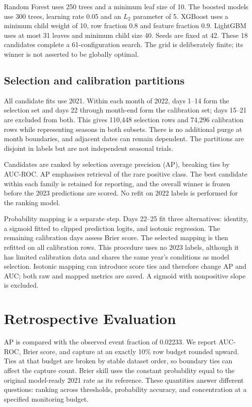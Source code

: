 \documentclass[conference]{IEEEtran}
\begin{document}
Random Forest uses 250 trees and a minimum leaf size of 10. The boosted models use 300 trees, learning rate 0.05 and an $L_2$ parameter of 5. XGBoost uses a minimum child weight of 10, row fraction 0.8 and feature fraction 0.9. LightGBM uses at most 31 leaves and minimum child size 40. Seeds are fixed at 42. These 18 candidates complete a 61-configuration search. The grid is deliberately finite; its winner is not asserted to be globally optimal.

\subsection{Selection and calibration partitions}
All candidate fits use 2021. Within each month of 2022, days 1--14 form the selection set and days 22 through month-end form the calibration set; days 15--21 are excluded from both. This gives 110,448 selection rows and 74,296 calibration rows while representing seasons in both subsets. There is no additional purge at month boundaries, and adjacent dates can remain dependent. The partitions are disjoint in labels but are not independent seasonal trials.

Candidates are ranked by selection average precision (AP), breaking ties by AUC-ROC. AP emphasises retrieval of the rare positive class. The best candidate within each family is retained for reporting, and the overall winner is frozen before the 2023 predictions are scored. No refit on 2022 labels is performed for the ranking model.

Probability mapping is a separate step. Days 22--25 fit three alternatives: identity, a sigmoid fitted to clipped prediction logits, and isotonic regression. The remaining calibration days assess Brier score. The selected mapping is then refitted on all calibration rows. This procedure uses no 2023 labels, although it has limited calibration data and shares the same year's conditions as model selection. Isotonic mapping can introduce score ties and therefore change AP and AUC; both raw and mapped metrics are saved. A sigmoid with nonpositive slope is excluded.

\section{Retrospective Evaluation}
AP is compared with the observed event fraction of 0.02233. We report AUC-ROC, Brier score, and capture at an exactly 10\% row budget rounded upward. Ties at that budget are broken by stable dataset order, so boundary ties can affect the capture count. Brier skill uses the constant probability equal to the original model-ready 2021 rate as its reference. These quantities answer different questions: ranking across thresholds, probability accuracy, and concentration at a specified monitoring budget.
\end{document}
